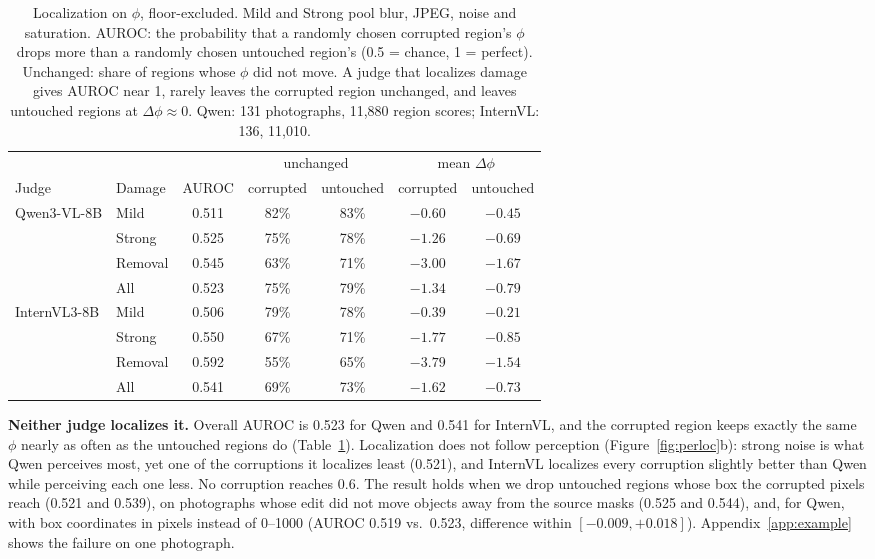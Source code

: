 \documentclass[10pt,a4paper]{article}
\begin{document}
\begin{table}[t]
\centering
\small
\begin{tabular}{llccccc}
\toprule
 & & & \multicolumn{2}{c}{unchanged} & \multicolumn{2}{c}{mean $\Delta\phi$} \\
\cmidrule(lr){4-5}\cmidrule(lr){6-7}
Judge & Damage & AUROC & corrupted & untouched & corrupted & untouched \\
\midrule
Qwen3-VL-8B  & Mild    & 0.511 & 82\% & 83\% & $-0.60$ & $-0.45$ \\
             & Strong  & 0.525 & 75\% & 78\% & $-1.26$ & $-0.69$ \\
             & Removal & 0.545 & 63\% & 71\% & $-3.00$ & $-1.67$ \\
             & All     & 0.523 & 75\% & 79\% & $-1.34$ & $-0.79$ \\
\midrule
InternVL3-8B & Mild    & 0.506 & 79\% & 78\% & $-0.39$ & $-0.21$ \\
             & Strong  & 0.550 & 67\% & 71\% & $-1.77$ & $-0.85$ \\
             & Removal & 0.592 & 55\% & 65\% & $-3.79$ & $-1.54$ \\
             & All     & 0.541 & 69\% & 73\% & $-1.62$ & $-0.73$ \\
\bottomrule
\end{tabular}
\caption{Localization on $\phi$, floor-excluded. Mild and Strong pool blur, JPEG, noise and saturation. AUROC: the probability that a randomly chosen corrupted region's $\phi$ drops more than a randomly chosen untouched region's (0.5 = chance, 1 = perfect). Unchanged: share of regions whose $\phi$ did not move. A judge that localizes damage gives AUROC near 1, rarely leaves the corrupted region unchanged, and leaves untouched regions at $\Delta\phi \approx 0$. Qwen: 131 photographs, 11,880 region scores; InternVL: 136, 11,010.}
\label{tab:localization}
\end{table}

\textbf{Neither judge localizes it.} Overall AUROC is 0.523 for Qwen and 0.541 for InternVL, and the corrupted region keeps exactly the same $\phi$ nearly as often as the untouched regions do (Table~\ref{tab:localization}). Localization does not follow perception (Figure~\ref{fig:perloc}b): strong noise is what Qwen perceives most, yet one of the corruptions it localizes least (0.521), and InternVL localizes every corruption slightly better than Qwen while perceiving each one less. No corruption reaches 0.6. The result holds when we drop untouched regions whose box the corrupted pixels reach (0.521 and 0.539), on photographs whose edit did not move objects away from the source masks (0.525 and 0.544), and, for Qwen, with box coordinates in pixels instead of 0--1000 (AUROC 0.519 vs.\ 0.523, difference within $[-0.009, +0.018]$). Appendix~\ref{app:example} shows the failure on one photograph.
\end{document}
